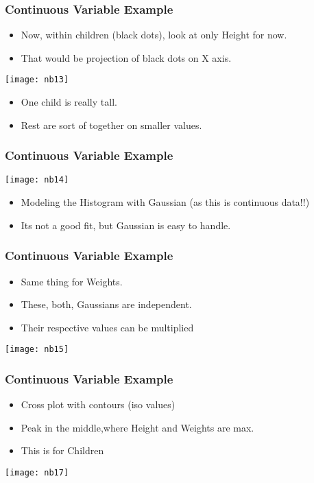 \begin{frame}[fragile]\frametitle{Continuous Variable Example}
\begin{itemize}
\item  Now, within children (black dots), look at only Height for now.
\item  That would be projection of black dots on X axis.
\end{itemize}
\begin{center}
\texttt{[image: nb13]}
\end{center}
\begin{itemize}
\item  One child is really tall.
\item Rest are sort of together on smaller values.
\end{itemize}
\end{frame}

\begin{frame}[fragile]\frametitle{Continuous Variable Example}
\begin{center}
\texttt{[image: nb14]}
\end{center}
\begin{itemize}
\item  Modeling the Histogram with Gaussian (as this is continuous data!!)
\item Its not a good fit, but Gaussian is easy to handle.
\end{itemize}
\end{frame}

\begin{frame}[fragile]\frametitle{Continuous Variable Example}
\begin{itemize}
\item  Same thing for Weights.
\item These, both, Gaussians are independent.
\item Their respective values can be multiplied
\end{itemize}
\begin{center}
\texttt{[image: nb15]}
\end{center}
\end{frame}

\begin{frame}[fragile]\frametitle{Continuous Variable Example}
\begin{itemize}
\item Cross plot with contours (iso values)
\item Peak in the middle,where Height and Weights are max.
\item This is for Children
\end{itemize}
\begin{center}
\texttt{[image: nb17]}
\end{center}
\end{frame}

